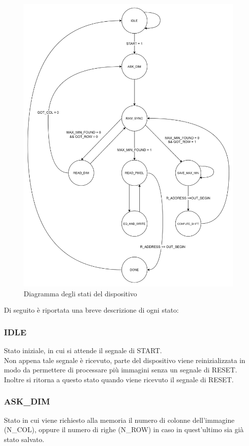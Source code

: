 \documentclass[a4paper, 12pt]{article}
\begin{document}
\bigskip
\begin{figure}[h]
    \centering
    \includegraphics[scale=0.149]{architettura/FSM diagram.png}
    \caption{Diagramma degli stati del dispositivo}
    \label{fig:fsm_diagram}
\end{figure}


\pagebreak
Di seguito è riportata una breve descrizione di ogni stato:

\subsubsection{IDLE}
Stato iniziale, in cui si attende il segnale di START. \\
Non appena tale segnale è ricevuto, parte del dispositivo viene reinizializzata in modo da permettere di processare più immagini senza un segnale di RESET. \\
Inoltre si ritorna a questo stato quando viene ricevuto il segnale di RESET.
\subsubsection{ASK\_DIM}
Stato in cui viene richiesto alla memoria il numero di colonne dell'immagine (N\_COL), oppure il numero di righe (N\_ROW) in caso in quest'ultimo sia già stato salvato.
\end{document}

